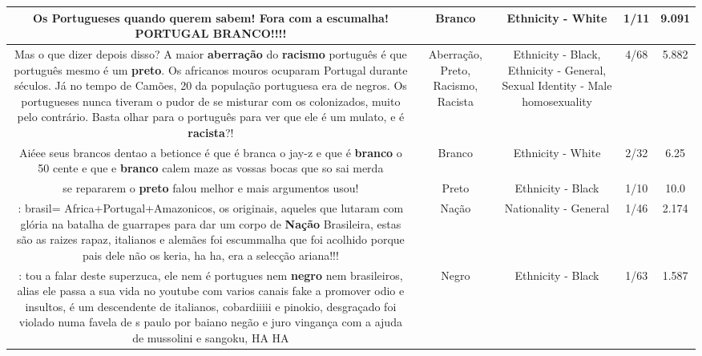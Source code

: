 \documentclass[11pt]{article}
\newlength\mylength
\begin{document}
\begin{center}
\begin{longtable}{|C{.65\mylength}|C{.30\mylength}|C{.12\mylength}|C{.12\mylength}|C{.12\mylength}|}
  \small Os Portugueses quando querem sabem! Fora com a escumalha! PORTUGAL \textbf{BRANCO}!!!!\normalsize   & Branco & Ethnicity - White & 1/11 & 9.091 \\  \hline
  \small Mas o que dizer depois disso? A maior \textbf{aberração} do \textbf{racismo} português é que português mesmo é um \textbf{preto}. Os africanos mouros ocuparam Portugal durante séculos. Já no tempo de Camões, 20 da população portuguesa era de negros. Os portugueses nunca tiveram o pudor de se misturar com os colonizados, muito pelo contrário. Basta olhar para o português para ver que ele é um mulato, e é \textbf{racista}?!\normalsize   & Aberração, Preto, Racismo, Racista & Ethnicity - Black, Ethnicity - General, Sexual Identity - Male homosexuality & 4/68 & 5.882 \\  \hline
  \small Aiéee seus brancos dentao a betionce é que é branca o jay-z e que é \textbf{branco} o 50 cente e que e \textbf{branco} calem maze as vossas bocas que so sai merda\normalsize   & Branco & Ethnicity - White & 2/32 & 6.25 \\  \hline
  \small se repararem o \textbf{preto} falou melhor e mais argumentos usou!\normalsize   & Preto & Ethnicity - Black & 1/10 & 10.0 \\  \hline
  \small {}: brasil= Africa+Portugal+Amazonicos, os originais, aqueles que lutaram com glória na batalha de guarrapes para dar um corpo de \textbf{Nação} Brasileira, estas são as raizes rapaz, italianos e alemães foi escummalha que foi acolhido porque pais dele não os keria, ha ha, era a selecção ariana!!!\normalsize   & Nação & Nationality - General & 1/46 & 2.174 \\  \hline
  \small {} : tou a falar deste superzuca, ele nem é portugues nem \textbf{negro} nem brasileiros, alias ele passa a sua vida no youtube com varios canais fake a promover odio e insultos, é um descendente de italianos, cobardiiiii e pinokio, desgraçado foi violado numa favela de s paulo por baiano negão e juro vingança com a ajuda de mussolini e sangoku,  HA HA\normalsize   & Negro & Ethnicity - Black & 1/63 & 1.587 \\  \hline

\end{longtable}
\end{center}
\end{document}

